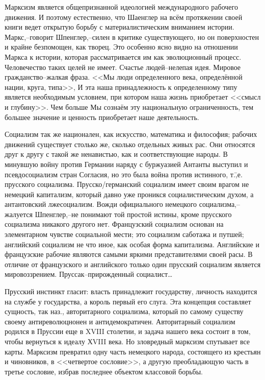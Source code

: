 Марксизм является общепризнанной идеологией международного рабочего движения. И поэтому естественно, что Шаенглер на всём протяжении своей книги ведет открытую борьбу с материалистическим вниманием истории. Маркс,\---говорит Шпенглер,\---силен в критике существующего, но он поверхностен и крайне безпомощен, как творец. Это особенно ясно видно на отношении Маркса к истории, которая рассматривается им как эволюционный процесс. Человечество таких целей не имеет. Счастье людей\---нелепая идея. Мировое гражданство\---жалкая фраза. <<Мы люди определенного века, определённой нации, круга, типа>>, И эта наша принадлежность к определенному типу является необходимым условием, при котором наша жизнь приобретает <<смысл и глубину>>. Чем больше Мы сознаём эту национальную ограниченность, тем большее значение и ценность приобретает наше деятельность.

Социализм так же национален, как искусство, математика и философия; рабочих движений существует столько же, сколько отдельных живых рас. Они относятся друг к другу с такой же ненавистью, как и соответствующие народы. В минувшую войну против Германии наряду с буржуазией Антанты выступил и псевдосоциализм стран Согласия, но это была война против истинного, т.\=,е. прусского социализма. Прусско\-/германский социализм имеет своим врагом не немецкий капитализм, который давно уже проникся социалистическим духом, а антантовский лжесоциализм. Вожди официального немецкого социализма,\---жалуется Шпенглер,\---не понимают той простой истины, кроме прусского социализма никакого другого нет. Французский социализм основан на элементарном чувстве социальной мести; это социализм саботажа и путшей; английский социализм не что иное, как особая форма капитализма. Английские и французские рабочие являются самыми яркими представителями своей расы. В отличие от французского и английского только один прусский социализм является мировоззрением. Пруссак\---прирожденный социалист\dots

Прусский инстинкт гласит: власть принадлежит государству, личность находится на службе у государства, а король первый его слуга. Эта концепция составляет сущность, так наз., авторитарного социализма, который по самому существу своему антиреволюцнонен и антидемократичен. Авторитарный социализм родился в Пруссии еще в XVIII столетии, и задача нашего века состоит в том, чтобы вернуться к идеалу ХVIII века. Но зловредный марксизм спутывает все карты. Марксизм превратил одну часть немецкого народа, состоящего из крестьян и чиновников, в <<четвертое сословие>>, а другую преобладающую часть в третье сословие, избрав последнее объектом классовой борьбы.

